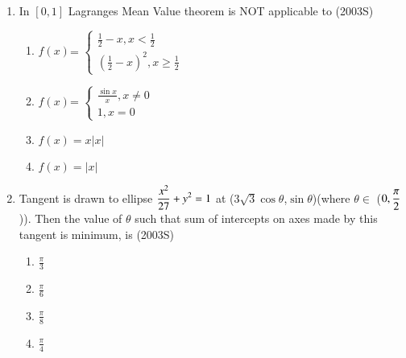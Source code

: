 \documentclass[journal,12pt,twocolumn]{IEEEtran}
\theoremstyle{remark}
\begin{document}
\begin{enumerate}[start=9]
\item In $[0,1]$ Lagranges Mean Value theorem is NOT applicable to
\hfill {(2003S)}

\begin{enumerate}
    \item $f(x)$=
    $\begin{cases}
         \displaystyle\frac{1}{2}-x, x<\displaystyle\frac{1}{2}\\
        \left(\displaystyle\frac{1}{2}-x\right)^2, x\geq \displaystyle\frac{1}{2}
    \end{cases}$\\
     \item $f(x)$=
    $\begin{cases}
        \displaystyle\frac{\sin x}{x}, x\neq 0\\
        1, x=0
    \end{cases}$\\
    \item $f(x)=x|x|$
    \item $f(x)= |x|$\\
\end{enumerate}
\item Tangent is drawn to ellipse $\displaystyle\displaystyle\frac{x^2}{27}+y^2 = 1$ at ($3\sqrt{3}\cos\theta$,$\sin\theta$)(where $\theta \in $ ($0,\displaystyle\displaystyle\frac{\pi}{2}$)). Then the value of $\theta$ such that sum of intercepts on axes made by this tangent is minimum, is
\hfill {(2003S)}
\begin{enumerate}
    \item $\displaystyle\frac{\pi}{3}$\\
    \item $\displaystyle\frac{\pi}{6}$\\
    \item $\displaystyle\frac{\pi}{8}$\\
    \item $\displaystyle\frac{\pi}{4}$\\
 \end{enumerate}
\end{enumerate}
\end{document}
